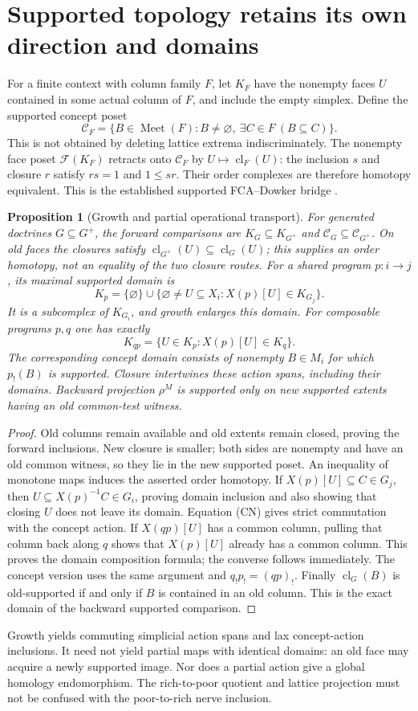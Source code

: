 \documentclass[11pt]{article}
\newtheorem{proposition}[theorem]{Proposition}
\theoremstyle{definition}\newtheorem{definition}[theorem]{Definition}
\theoremstyle{remark}\newtheorem{remark}[theorem]{Remark}
\newcommand{\Meet}{\operatorname{Meet}}
\newcommand{\cl}{\operatorname{cl}}
\begin{document}
\section{Supported topology retains its own direction and domains}
\label{sec:supported}
For a finite context with column family $F$, let $K_F$ have the nonempty
faces $U$ contained in some actual column of $F$, and include the empty
simplex. Define the supported concept poset
\[
 \mathcal C_F=\{B\in\Meet(F): B\ne\varnothing,
                         \ \exists C\in F\ (B\subseteq C)\}.
\]
This is not obtained by deleting lattice extrema indiscriminately. The
nonempty face poset $\mathcal F(K_F)$ retracts onto $\mathcal C_F$ by
$U\mapsto\cl_F(U)$: the inclusion $s$ and closure $r$ satisfy
$rs=1$ and $1\leq sr$. Their order complexes are therefore homotopy
equivalent. This is the established supported FCA--Dowker bridge
\cite{Common,GP,BS}.

\begin{proposition}[Growth and partial operational transport]
For generated doctrines $G\subseteq G^+$, the forward comparisons are
$K_G\subseteq K_{G^+}$ and $\mathcal C_G\subseteq\mathcal C_{G^+}$.
On old faces the closures satisfy $\cl_{G^+}(U)\subseteq\cl_G(U)$;
this supplies an order homotopy, not an equality of the two closure routes.
For a shared program $p:i\to j$, its maximal supported domain is
\[
 K_p=\{\varnothing\}\cup
 \{\varnothing\ne U\subseteq X_i:X(p)[U]\in K_{G_j}\}.
\]
It is a subcomplex of $K_{G_i}$, and growth enlarges this domain.
For composable programs $p,q$ one has exactly
\[
 K_{qp}=\{U\in K_p:X(p)[U]\in K_q\}.
\]
The corresponding concept domain consists of nonempty $B\in M_i$ for
which $p_!(B)$ is supported. Closure intertwines these action spans,
including their domains. Backward projection $\rho^M$ is supported
only on new supported extents having an old common-test witness.
\end{proposition}
\begin{proof}
Old columns remain available and old extents remain closed, proving the
forward inclusions. New closure is smaller; both sides are nonempty and
have an old common witness, so they lie in the new supported poset.
An inequality of monotone maps induces the asserted order homotopy.
If $X(p)[U]\subseteq C\in G_j$, then
$U\subseteq X(p)^{-1}C\in G_i$, proving domain inclusion and also
showing that closing $U$ does not leave its domain. Equation (CN) gives
strict commutation with the concept action. If $X(qp)[U]$ has a
common column, pulling that column back along $q$ shows that $X(p)[U]$
already has a common column. This proves the domain composition formula;
the converse follows immediately. The concept version uses the same
argument and $q_!p_!=(qp)_!$. Finally $\cl_G(B)$ is old-supported
if and only if $B$ is contained in an old column. This is the exact
domain of the backward supported comparison.
\end{proof}
Growth yields commuting simplicial action spans and lax concept-action
inclusions. It need not yield partial maps with identical domains: an old
face may acquire a newly supported image. Nor does a partial action give
a global homology endomorphism. The rich-to-poor quotient and lattice
projection must not be confused with the poor-to-rich nerve inclusion.
\end{document}
